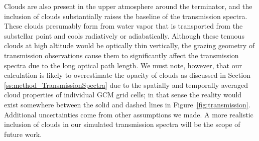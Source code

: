 \documentclass[11pt,numberedappendix,twocolappendix,]{emulateapj}
\newcommand{\yf}[1]{{\color{orange}#1}}
\begin{document}
\yf{Clouds} are also present in the upper atmosphere around the terminator, and the inclusion of clouds substantially raises the baseline of the transmission spectra. 
%
These clouds presumably form from water vapor that is transported from the substellar point and cools radiatively or adiabatically. 
%
%
Although these tenuous clouds at high altitude would be optically thin vertically, the grazing geometry of transmission observations cause them to significantly affect the transmission spectra due to the long optical path length. 
We must note, however, that our calculation is likely to overestimate the opacity of clouds as discussed in Section \ref{ss:method_TransmissionSpectra} \yf{due to the spatially and temporally averaged cloud properties of individual GCM grid cells;} 
in that sense the reality would exist somewhere between the solid and dashed lines in Figure~\ref{fig:transmission}.
Additional uncertainties come from other assumptions we made. 
A more realistic inclusion of clouds in our simulated transmission spectra will be the scope of future work. 
\end{document}
